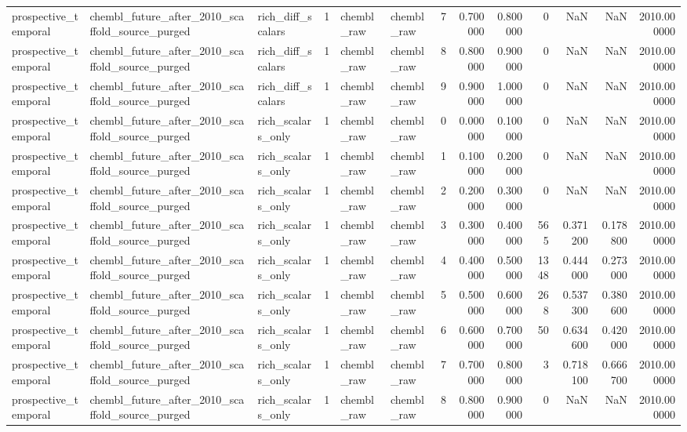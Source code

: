\begin{longtable}{lllrllrrrrrrr}
prospective\_temporal & chembl\_future\_after\_2010\_scaffold\_source\_purged & rich\_diff\_scalars & 1 & chembl\_raw & chembl\_raw & 7 & 0.700000 & 0.800000 & 0 & NaN & NaN & 2010.000000 \\
prospective\_temporal & chembl\_future\_after\_2010\_scaffold\_source\_purged & rich\_diff\_scalars & 1 & chembl\_raw & chembl\_raw & 8 & 0.800000 & 0.900000 & 0 & NaN & NaN & 2010.000000 \\
prospective\_temporal & chembl\_future\_after\_2010\_scaffold\_source\_purged & rich\_diff\_scalars & 1 & chembl\_raw & chembl\_raw & 9 & 0.900000 & 1.000000 & 0 & NaN & NaN & 2010.000000 \\
prospective\_temporal & chembl\_future\_after\_2010\_scaffold\_source\_purged & rich\_scalars\_only & 1 & chembl\_raw & chembl\_raw & 0 & 0.000000 & 0.100000 & 0 & NaN & NaN & 2010.000000 \\
prospective\_temporal & chembl\_future\_after\_2010\_scaffold\_source\_purged & rich\_scalars\_only & 1 & chembl\_raw & chembl\_raw & 1 & 0.100000 & 0.200000 & 0 & NaN & NaN & 2010.000000 \\
prospective\_temporal & chembl\_future\_after\_2010\_scaffold\_source\_purged & rich\_scalars\_only & 1 & chembl\_raw & chembl\_raw & 2 & 0.200000 & 0.300000 & 0 & NaN & NaN & 2010.000000 \\
prospective\_temporal & chembl\_future\_after\_2010\_scaffold\_source\_purged & rich\_scalars\_only & 1 & chembl\_raw & chembl\_raw & 3 & 0.300000 & 0.400000 & 565 & 0.371200 & 0.178800 & 2010.000000 \\
prospective\_temporal & chembl\_future\_after\_2010\_scaffold\_source\_purged & rich\_scalars\_only & 1 & chembl\_raw & chembl\_raw & 4 & 0.400000 & 0.500000 & 1348 & 0.444000 & 0.273000 & 2010.000000 \\
prospective\_temporal & chembl\_future\_after\_2010\_scaffold\_source\_purged & rich\_scalars\_only & 1 & chembl\_raw & chembl\_raw & 5 & 0.500000 & 0.600000 & 268 & 0.537300 & 0.380600 & 2010.000000 \\
prospective\_temporal & chembl\_future\_after\_2010\_scaffold\_source\_purged & rich\_scalars\_only & 1 & chembl\_raw & chembl\_raw & 6 & 0.600000 & 0.700000 & 50 & 0.634600 & 0.420000 & 2010.000000 \\
prospective\_temporal & chembl\_future\_after\_2010\_scaffold\_source\_purged & rich\_scalars\_only & 1 & chembl\_raw & chembl\_raw & 7 & 0.700000 & 0.800000 & 3 & 0.718100 & 0.666700 & 2010.000000 \\
prospective\_temporal & chembl\_future\_after\_2010\_scaffold\_source\_purged & rich\_scalars\_only & 1 & chembl\_raw & chembl\_raw & 8 & 0.800000 & 0.900000 & 0 & NaN & NaN & 2010.000000 \\

\end{longtable}
